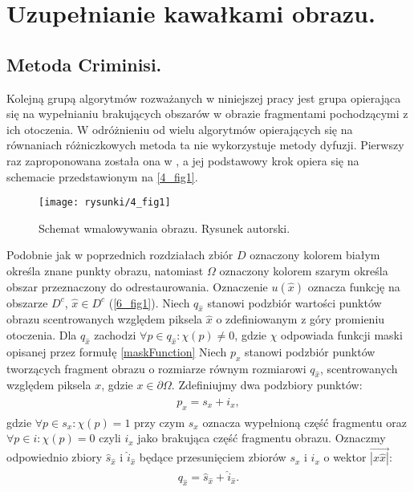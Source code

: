 \documentclass[a4paper,12pt,twoside,openany]{report}
\begin{document}
\chapter{Uzupełnianie kawałkami obrazu.}
\section{Metoda Criminisi.}
\label{sec:crimMetod}
Kolejną grupą algorytmów rozważanych w niniejszej pracy jest grupa opierająca się na wypełnianiu brakujących obszarów w obrazie fragmentami pochodzącymi z ich otoczenia. W odróżnieniu od wielu algorytmów opierających się na równaniach różniczkowych metoda ta nie wykorzystuje metody dyfuzji. Pierwszy raz zaproponowana została ona w \cite{efros1999texture}, a jej podstawowy krok opiera się na schemacie przedstawionym na \autoref{4_fig1}.
\begin{figure}[!h]
	\centering
	\texttt{[image: rysunki/4\_fig1]}
	\caption{Schemat wmalowywania obrazu. Rysunek autorski.}
	\label{4_fig1}
\end{figure}
Podobnie jak w poprzednich rozdziałach zbiór $D$ oznaczony kolorem białym
określa znane punkty obrazu, natomiast $\Omega$ oznaczony kolorem szarym określa obszar przeznaczony do odrestaurowania.
Oznaczenie $u(\hat{x})$ oznacza funkcję na obszarze $D^c$, $\hat{x}  \in D^c$ (\autoref{6_fig1}).
Niech $q_{\hat{x}}$ stanowi podzbiór wartości punktów obrazu scentrowanych względem piksela $\hat{x}$ o zdefiniowanym z góry promieniu otoczenia.
Dla $q_{\hat{x}}$ zachodzi $\forall p \in q_{\hat{x}} : \chi(p) \neq 0$, gdzie $\chi$ odpowiada funkcji maski opisanej przez formułę \eqref{maskFunction} 
Niech $p_{x}$ stanowi podzbiór punktów tworzących fragment obrazu o rozmiarze równym rozmiarowi $q_{\hat{x}}$, scentrowanych względem piksela $x$, gdzie $x \in \partial \Omega$.
Zdefiniujmy dwa podzbiory punktów:
\begin{align}
\begin{aligned}
p_{x} = s_x + i_x,
\end{aligned}
\end{align}
gdzie $\forall p \in s_x : \chi(p) = 1$ przy czym $s_x$ oznacza wypełnioną część fragmentu oraz $\forall p \in i : \chi(p) = 0$ czyli $i_x$ jako brakująca część fragmentu obrazu.  
Oznaczmy odpowiednio zbiory $\hat{s}_{\hat{x}}$ i $\hat{i}_{\hat{x}}$ będące przesunięciem zbiorów $s_x$ i $i_x$ o wektor $\overrightarrow{|x \hat{x}|}$:
\begin{align}
\begin{aligned}
q_{\hat{x}} = \hat{s}_{\hat{x}} + \hat{i}_{\hat{x}}.
\end{aligned}
\end{align}
\end{document}
